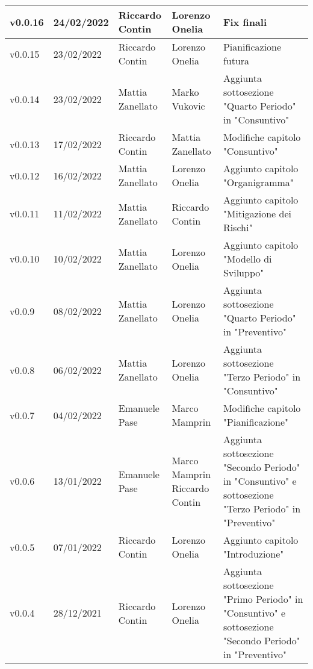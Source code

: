 {\begin{longtable}{|C{1.8cm}|C{2.1cm}|C{2cm}|C{2.4cm}|L{4.4cm}|}
  v0.0.16       & 24/02/2022     & Riccardo Contin  & Lorenzo Onelia                                & Fix finali \\ \hline
  v0.0.15       & 23/02/2022    & Riccardo Contin   & Lorenzo Onelia                  & Pianificazione futura \\ \hline
  v0.0.14       & 23/02/2022    & Mattia Zanellato  & Marko Vukovic                   & Aggiunta sottosezione "Quarto Periodo" in "Consuntivo" \\ \hline
  v0.0.13       & 17/02/2022    & Riccardo Contin   & Mattia Zanellato                & Modifiche capitolo "Consuntivo" \\ \hline
  v0.0.12       & 16/02/2022    & Mattia Zanellato  & Lorenzo Onelia                  & Aggiunto capitolo "Organigramma" \\ \hline
  v0.0.11       & 11/02/2022    & Mattia Zanellato  & Riccardo Contin                 & Aggiunto capitolo "Mitigazione dei Rischi" \\ \hline
  v0.0.10       & 10/02/2022    & Mattia Zanellato  & Lorenzo Onelia                  & Aggiunto capitolo "Modello di Sviluppo" \\ \hline
  v0.0.9        & 08/02/2022    & Mattia Zanellato  & Lorenzo Onelia                  & Aggiunta sottosezione "Quarto Periodo" in "Preventivo" \\ \hline
  v0.0.8        & 06/02/2022    & Mattia Zanellato  & Lorenzo Onelia                  & Aggiunta sottosezione "Terzo Periodo" in "Consuntivo" \\ \hline
  v0.0.7        & 04/02/2022    & Emanuele Pase     & Marco Mamprin                   & Modifiche capitolo "Pianificazione" \\ \hline
  v0.0.6        & 13/01/2022    & Emanuele Pase     & Marco Mamprin Riccardo Contin   & Aggiunta sottosezione "Secondo Periodo" in "Consuntivo" e sottosezione "Terzo Periodo" in "Preventivo" \\ \hline
  v0.0.5        & 07/01/2022    & Riccardo Contin   & Lorenzo Onelia                  & Aggiunto capitolo "Introduzione" \\ \hline
  v0.0.4        & 28/12/2021    & Riccardo Contin   & Lorenzo Onelia                  & Aggiunta sottosezione "Primo Periodo" in "Consuntivo" e sottosezione "Secondo Periodo" in "Preventivo" \\ \hline

\end{longtable}}
